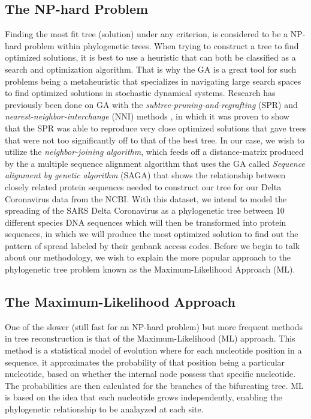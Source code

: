 \subsection{The NP-hard Problem}

Finding the most fit tree (solution) under any criterion, is considered to be a NP-hard problem within phylogenetic trees. When trying to construct a tree to find optimized solutions, it is best to use a heuristic that can both be classified as a search and optimization algorithm. That is why the GA is a great tool for such problems being a metaheuristic that specializes in navigating large search spaces to find optimized solutions in stochastic dynamical systems. Research has previously been done on GA with the \emph{subtree-pruning-and-regrafting} (SPR) and \emph{nearest-neighbor-interchange} (NNI) methods \cite{Money}, in which it was proven to show that the SPR was able to reproduce very close optimized solutions that gave trees that were not too significantly off to that of the best tree. In our case, we wish to utilize the \emph{neighbor-joining algorithm}, which feeds off a distance-matrix produced by the a multiple sequence alignment algorithm that uses the GA called \emph{Sequence alignment by genetic algorithm} (SAGA) that shows the relationship between closely related protein sequences needed to construct our tree for our Delta Coronavirus data from the NCBI. With this dataset, we intend to model the spreading of the SARS Delta Coronavirus as a phylogenetic tree between 10 different species DNA sequences which will then be transformed into protein sequences, in which we will produce the most optimized solution to find out the pattern of spread labeled by their genbank access codes. Before we begin to talk about our methodology, we wish to explain the more popular approach to the phylogenetic tree problem known as the Maximum-Likelihood Approach (ML). 

\subsection{The Maximum-Likelihood Approach}

One of the slower (still fast for an NP-hard problem) but more frequent methods in tree reconstruction is that of the Maximum-Likelihood (ML) approach. This method is a statistical model of evolution where for each nucleotide position in a sequence, it approximates the probability of that position being a particular nucleotide, based on whether the internal node possess that specific nucleotide. The probabilities are then calculated for the branches of the bifurcating tree. ML is based on the idea that each nucleotide grows independently, enabling the phylogenetic relationship to be analayzed at each site. 

